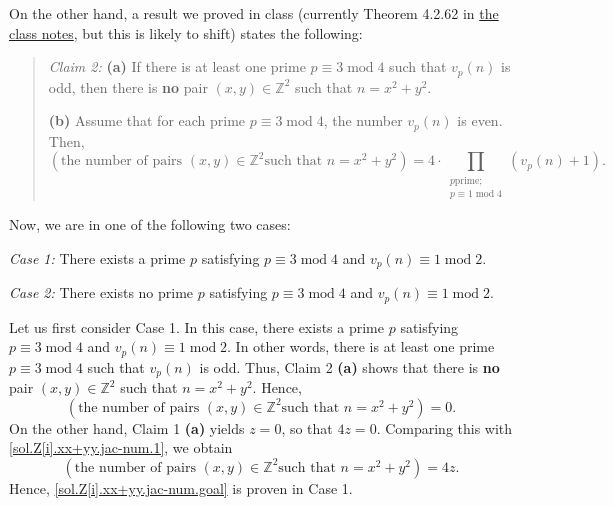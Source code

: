 \documentclass[paper=a4, fontsize=12pt]{scrartcl}%
\let\prodnonlimits\prod
\renewcommand{\prod}{\prodnonlimits\limits}
\theoremstyle{plainsl}
\theoremstyle{definition}
\theoremstyle{remark}
\newenvironment{statement}{\begin{quote}}{\end{quote}}
\begin{document}
On the other hand, a result we proved in class (currently Theorem 4.2.62 in
\href{http://www.cip.ifi.lmu.de/~grinberg/t/19s/notes.pdf}{the class notes},
but this is likely to shift) states the following:

\begin{statement}
\textit{Claim 2:} \textbf{(a)} If there is at least one prime $p\equiv
3\operatorname{mod}4$ such that $v_{p}\left(  n\right)  $ is odd, then there
is \textbf{no} pair $\left(  x,y\right)  \in\mathbb{Z}^{2}$ such that
$n=x^{2}+y^{2}$.

\textbf{(b)} Assume that for each prime $p\equiv3\operatorname{mod}4$, the
number $v_{p}\left(  n\right)  $ is even. Then,%
\[
\left(  \text{the number of pairs }\left(  x,y\right)  \in\mathbb{Z}^{2}\text{
such that }n=x^{2}+y^{2}\right)  =4\cdot\prod_{\substack{p\text{
prime;}\\p\equiv1\operatorname{mod}4}}\left(  v_{p}\left(  n\right)
+1\right)  .
\]

\end{statement}

Now, we are in one of the following two cases:

\textit{Case 1:} There exists a prime $p$ satisfying $p\equiv
3\operatorname{mod}4$ and $v_{p}\left(  n\right)  \equiv1\operatorname{mod}2$.

\textit{Case 2:} There exists no prime $p$ satisfying $p\equiv
3\operatorname{mod}4$ and $v_{p}\left(  n\right)  \equiv1\operatorname{mod}2$.

Let us first consider Case 1. In this case, there exists a prime $p$
satisfying $p\equiv3\operatorname{mod}4$ and $v_{p}\left(  n\right)
\equiv1\operatorname{mod}2$. In other words, there is at least one prime
$p\equiv3\operatorname{mod}4$ such that $v_{p}\left(  n\right)  $ is odd.
Thus, Claim 2 \textbf{(a)} shows that there is \textbf{no} pair $\left(
x,y\right)  \in\mathbb{Z}^{2}$ such that $n=x^{2}+y^{2}$. Hence,%
\begin{equation}
\left(  \text{the number of pairs }\left(  x,y\right)  \in\mathbb{Z}^{2}\text{
such that }n=x^{2}+y^{2}\right)  =0. \label{sol.Z[i].xx+yy.jac-num.1}%
\end{equation}
On the other hand, Claim 1 \textbf{(a)} yields $z=0$, so that $4z=0$.
Comparing this with \eqref{sol.Z[i].xx+yy.jac-num.1}, we obtain%
\[
\left(  \text{the number of pairs }\left(  x,y\right)  \in\mathbb{Z}^{2}\text{
such that }n=x^{2}+y^{2}\right)  =4z.
\]
Hence, \eqref{sol.Z[i].xx+yy.jac-num.goal} is proven in Case 1.
\end{document}
